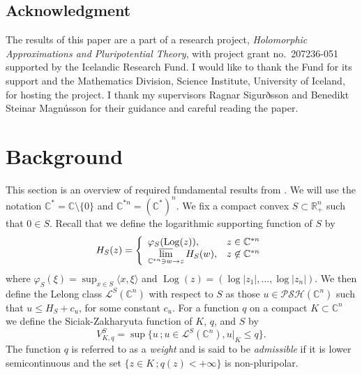 \documentclass[a4paper,12pt,leqno,english]{article}
\numberwithin{equation}{section}
\begin{document}
\subsection*{Acknowledgment}  
The results of this paper are a part of a research project, 
{\it Holomorphic Approximations and Pluripotential Theory},
with  project grant 
no.~207236-051 supported by the Icelandic Research Fund.
I would like to thank the Fund for its support and the Mathematics Division, Science Institute, University of Iceland, for hosting the project.
I thank my supervisors Ragnar Sigurðsson and Benedikt Steinar Magnússon for their guidance and careful reading the paper.

\section{Background}
\label{sec:bg}
This section is an overview of required fundamental results from \cite{MagSigSigSno:2023}.
We will use the notation $\mathbb{C}^* = \mathbb{C} \setminus \{0\}$ and $\mathbb{C}^{*n} = (\mathbb{C}^*)^n$.
We fix a compact convex $S \subset \mathbb{R}_+^n$ such that $0 \in S$.
Recall that we define the logarithmic supporting function of $S$ by
\begin{equation*}
    H_S(z)
    =
    \left \{
        \begin{array}{l l}
            \varphi_S(\operatorname{Log}(z)), & z \in \mathbb{C}^{*n}\\
            \varlimsup\limits_{\mathbb{C}^{*n} \ni w \rightarrow z} H_S(w), & z \not \in \mathbb{C}^{*n}\\
        \end{array}
    \right .
\end{equation*}
where $\varphi_S(\xi) = \sup_{x \in S} \langle x, \xi \rangle$ and
    $\operatorname{Log}(z) = (\log|z_1|, \dots, \log|z_n|)$.
We then define the Lelong class $\mathcal{L}^S(\mathbb{C}^n)$
    with respect to $S$ as those $u \in \mathcal{PSH}(\mathbb{C}^n)$ such that $u \leq H_S + c_u$, for some constant $c_u$.
For a function $q$ on a compact $K \subset \mathbb{C}^n$ we define the Siciak-Zakharyuta function of $K$, $q$, and $S$ by
\begin{equation*}
    V^S_{K, q}
    =
    \sup
    \{
        u \,; u \in \mathcal{L}^S(\mathbb{C}^n), u|_K \leq q
    \}.
\end{equation*}
The function $q$ is referred to as a \emph{weight} and is said to be \emph{admissible} if it is lower semicontinuous and the set
    $\{z \in K \,; q(z) < +\infty\}$ is non-pluripolar.
\end{document}
